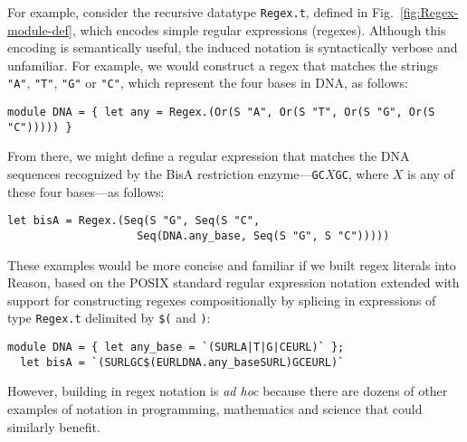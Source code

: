 \documentclass[acmsmall,review]{acmart}
\newcommand{\li}[1]{\lstinline[basicstyle=\ttfamily\fontsize{9pt}{1em}\selectfont]{#1}}
\theoremstyle{slplain}
\numberwithin{thm}{section}
\begin{document}
For example, consider the recursive datatype \li{Regex.t}, defined in Fig.~\ref{fig:Regex-module-def}, which encodes simple regular expressions (regexes). Although this encoding is semantically useful, the induced notation is syntactically verbose and unfamiliar. For example, we would construct a regex that matches the strings \li{"A"}, \li{"T"}, \li{"G"} or \li{"C"}, which represent the four bases in DNA, as follows:
\begin{lstlisting}[numbers=none]
module DNA = { let any = Regex.(Or(S "A", Or(S "T", Or(S "G", Or(S "C"))))) }
\end{lstlisting}
From there, we might define a regular expression that matches the DNA sequences recognized by the BisA restriction enzyme---\li{GC}$X$\li{GC}, where $X$ is any of these four bases---as follows:
\begin{lstlisting}[numbers=none]
  let bisA = Regex.(Seq(S "G", Seq(S "C", 
                    Seq(DNA.any_base, Seq(S "G", S "C")))))
\end{lstlisting}

These examples would be more concise and familiar if we built regex literals into Reason, based on the POSIX standard regular expression notation extended with support for constructing regexes compositionally by splicing in expressions of type \li{Regex.t} delimited by \li{$(} and \li{)}:
\begin{lstlisting}[numbers=none]
  module DNA = { let any_base = `(SURLA|T|G|CEURL)` };
  let bisA = `(SURLGC$(EURLDNA.any_baseSURL)GCEURL)`
\end{lstlisting}
\noindent
However, building in regex notation is \emph{ad hoc} because there are dozens of other examples of notation in programming, mathematics and science that could similarly benefit. 
\end{document}
